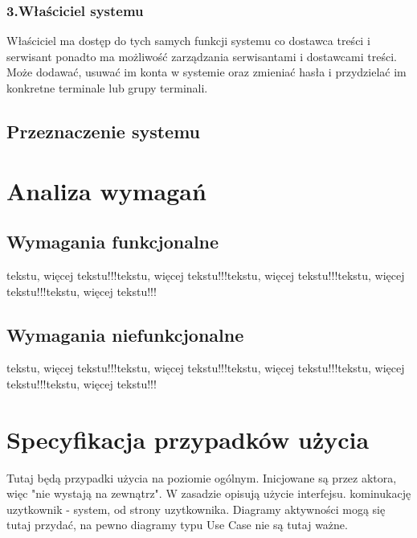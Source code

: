 \documentclass[a4paper,titlepage,twoside,openright]{report} %
\begin{document}
			\subsection{3.Właściciel systemu}
				Właściciel ma dostęp do tych samych funkcji systemu co dostawca treści i serwisant ponadto ma możliwość zarządzania serwisantami i dostawcami treści. Może dodawać, usuwać im konta w systemie oraz zmieniać hasła i przydzielać im konkretne terminale lub grupy terminali.
		\section{Przeznaczenie systemu}

	\chapter{Analiza wymagań}
		\section{Wymagania funkcjonalne}
		    tekstu, więcej tekstu!!!tekstu, więcej tekstu!!!tekstu, więcej tekstu!!!tekstu, więcej tekstu!!!tekstu, więcej tekstu!!!
		\section{Wymagania niefunkcjonalne}
		    tekstu, więcej tekstu!!!tekstu, więcej tekstu!!!tekstu, więcej tekstu!!!tekstu, więcej tekstu!!!tekstu, więcej tekstu!!!
	\cleardoublepage
	\pagestyle{fancy}	
	
	\chapter{Specyfikacja przypadków użycia}	
	
		Tutaj będą przypadki użycia na poziomie ogólnym. Inicjowane są przez aktora, więc "nie wystają na zewnątrz". W zasadzie opisują użycie interfejsu. kominukację uzytkownik - system, od strony uzytkownika.\newline
		Diagramy aktywności mogą się tutaj przydać, na pewno diagramy typu Use Case nie są tutaj ważne.\newline
\end{document}
